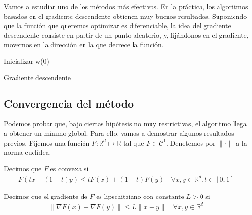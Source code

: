 Vamos a estudiar uno de los métodos más efectivos. En la práctica, los algoritmos basados en el gradiente descendente obtienen muy buenos resultados. Suponiendo que la función que queremos optimizar es diferenciable, la idea del gradiente descendente consiste en partir de un punto aleatorio, y, fijándonos en el gradiente, movernos en la dirección en la que decrece la función. 

\begin{algorithm}
	\SetAlgoLined
	Inicializar w(0)\\
	\caption{Gradiente descendente}
\end{algorithm}


\subsection{Convergencia del método}
Podemos probar que, bajo ciertas hipótesis no muy restrictivas, el algoritmo llega a obtener un mínimo global. Para ello, vamos a demostrar algunos resultados previos. Fijemos una función $F \colon \mathbb{R}^d \mapsto \mathbb{R}$ tal que $F \in \mathcal{C}^1$. Denotemos por $\| \cdot \|$ a la norma euclídea.

\begin{definition}
	Decimos que $F$ es convexa si
	\begin{align*}
		F(tx + (1-t)y) \leq tF(x) + (1-t)F(y) \quad \forall x, y \in \mathbb{R}^d, t \in [0,1]
	\end{align*}
\end{definition}

\begin{definition}
	Decimos que el gradiente de $F$ es lipschitziano con constante $L>0$ si 
	\begin{align*}
		\| \nabla F(x) - \nabla F(y)\| \leq L \| x-y \| \quad \forall x, y \in \mathbb{R}^d
	\end{align*}
\end{definition}

